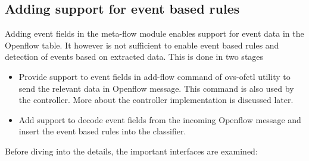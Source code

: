\subsection{Adding support for event based rules}
Adding event fields in the meta-flow module enables support for event data in the Openflow table. It however is not sufficient to enable event based rules and detection of events based on  extracted data. This is done in two stages
\begin{itemize}
\item Provide support to event fields in add-flow command  of ovs-ofctl utility to send the relevant data in Openflow message. This command is also used by the controller. More about the controller implementation is discussed later.
\item Add support to decode event fields from the incoming Openflow message and insert the event based rules into the classifier.
\end{itemize}
Before diving into the details, the important interfaces are examined:
